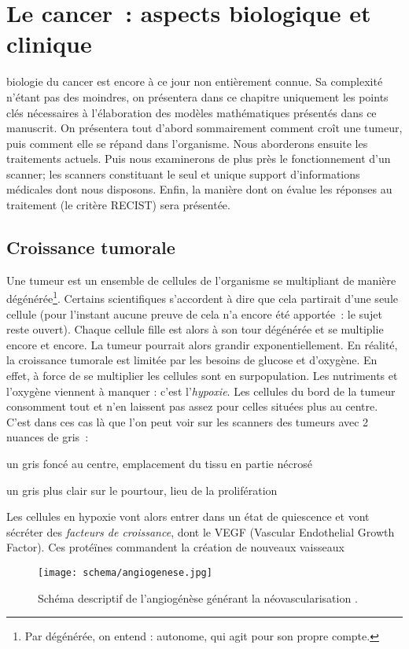 \documentclass[main.tex]{subfiles}
\begin{document}
\chapter{Le cancer~: aspects biologique et clinique \label{chap:biologie_du_cancer}}
 biologie du cancer est encore à ce jour non entièrement connue. Sa complexité n'étant pas des moindres, on présentera dans ce chapitre uniquement les points clés nécessaires à l'élaboration des modèles mathématiques présentés dans ce manuscrit. On présentera tout d'abord sommairement comment croît une tumeur, puis comment elle se répand dans l'organisme. Nous aborderons ensuite les traitements actuels. Puis nous examinerons de plus près le fonctionnement d'un scanner; les scanners constituant le seul et unique support d'informations médicales dont nous disposons. Enfin, la manière dont on évalue les réponses au traitement (le critère RECIST) sera présentée.

\section{Croissance tumorale}
Une tumeur est un ensemble de cellules de l'organisme se multipliant de manière dégénérée\footnote{Par dégénérée, on entend : autonome, qui agit pour son propre compte.}. Certains scientifiques s'accordent à dire que cela partirait d'une seule cellule (pour l'instant aucune preuve de cela n'a encore été apportée~: le sujet reste ouvert). 
Chaque cellule fille est alors à son tour dégénérée et se multiplie encore et encore. 
La tumeur pourrait alors grandir exponentiellement. En réalité, la croissance tumorale est limitée par les besoins de glucose et d'oxygène. En effet, à force de se multiplier les cellules sont en surpopulation. Les nutriments et l'oxygène viennent à manquer : c'est l'\emph{hypoxie}. Les cellules du bord de la tumeur consomment tout et n'en laissent pas assez pour celles situées plus au centre. C'est dans ces cas là que l'on peut voir sur les scanners des tumeurs avec 2 nuances de gris~:
\begin{myitemize}
\item un gris foncé au centre, emplacement du tissu en partie nécrosé
\item un gris plus clair sur le pourtour, lieu de la prolifération
\end{myitemize}
Les cellules en hypoxie vont alors entrer dans un état de quiescence et vont sécréter des \emph{facteurs de croissance}, dont le VEGF (Vascular Endothelial Growth Factor). 
\noindent
Ces protéïnes commandent la création de nouveaux vaisseaux  
\begin{wrapfigure}[18]{R}{.5\textwidth}
\texttt{[image: schema/angiogenese.jpg]}
\caption{\label{fig:schema_angio} Schéma descriptif de l'angiogénèse générant la néovascularisation \cite{webangiogenese}.}
\end{wrapfigure}
\end{document}
